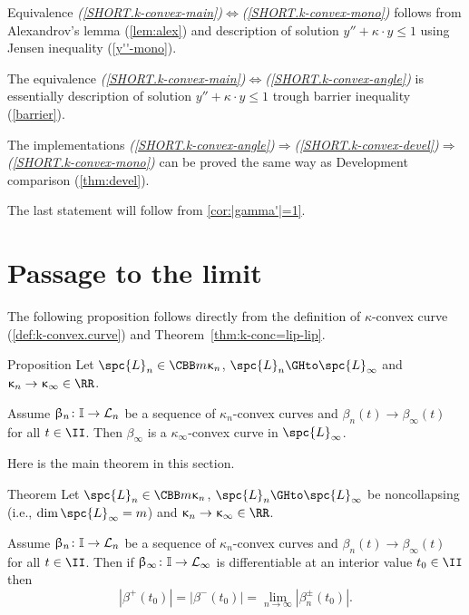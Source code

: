  Equivalence {\it (\ref{SHORT.k-convex-main})$\Leftrightarrow$(\ref{SHORT.k-convex-mono})} follows from Alexandrov's lemma (\ref{lem:alex}) and description of solution $y''+\kappa\cdot  y\le 1$ using Jensen inequality (\ref{y''-mono}).

The equivalence {\it(\ref{SHORT.k-convex-main})$\Leftrightarrow$(\ref{SHORT.k-convex-angle})} is essentially description of solution $y''+\kappa\cdot  y\le 1$ trough barrier inequality (\ref{barrier}).

The implementations {\it(\ref{SHORT.k-convex-angle})$\Rightarrow$(\ref{SHORT.k-convex-devel})$\Rightarrow$(\ref{SHORT.k-convex-mono})} can be proved the same way as Development comparison (\ref{thm:devel}).

The last statement will follow from \ref{cor:|gamma'|=1}.%
\qeds













\section{Passage to the limit}

The following proposition follows directly from the definition of $\kappa$-convex curve (\ref{def:k-convex.curve}) and Theorem~\ref{thm:k-conc=lip-lip}.

\begin{thm}{Proposition}\label{prop:lim-length}
Let 
$\spc{L}_n\in\CBB m{\kappa_n}$, 
$\spc{L}_n\GHto \spc{L}_\infty$
and $\kappa_n\to\kappa_\infty\in\RR$.

Assume $\beta_n\:\II\to \spc{L}_n$ be a sequence of $\kappa_n$-convex curves
and $\beta_n(t)\to \beta_\infty(t)$ for all $t\in\II$.
Then $\beta_\infty$ is a $\kappa_\infty$-convex curve in $\spc{L}_\infty$.
\end{thm}


Here is the main theorem in this section.

\begin{thm}{Theorem}\label{thm:lim-length}
Let 
$\spc{L}_n\in\CBB m{\kappa_n}$, 
$\spc{L}_n\GHto \spc{L}_\infty$ be noncollapsing (i.e., $\dim\spc{L}_\infty=m$)
and $\kappa_n\to\kappa_\infty\in\RR$.

Assume $\beta_n\:\II\to \spc{L}_n$ be a sequence of $\kappa_n$-convex curves
and $\beta_n(t)\to \beta_\infty(t)$ for all $t\in\II$.
Then if $\beta_\infty\:\II\to\spc{L}_\infty$ is differentiable at an interior value $t_0\in\II$
then 
\[|\beta^+(t_0)|=|\beta^-(t_0)|=\lim_{n\to\infty} |\beta_n^\pm(t_0)|.\]

\end{thm}


